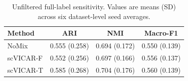 \begin{table}[h]
\centering
\footnotesize
\caption{Unfiltered full-label sensitivity. Values are means (SD) across six dataset-level seed averages.}
\label{tab:full_label_sensitivity}
\begin{tabular}{lccc}
\toprule
Method & ARI & NMI & Macro-F1 \\ 
\midrule
NoMix & 0.555 (0.258) & 0.694 (0.172) & 0.550 (0.139) \\
scVICAR-F & 0.552 (0.256) & 0.697 (0.166) & 0.556 (0.137) \\
scVICAR-T & 0.585 (0.268) & 0.704 (0.176) & 0.560 (0.139) \\
\bottomrule
\end{tabular}
\end{table}
